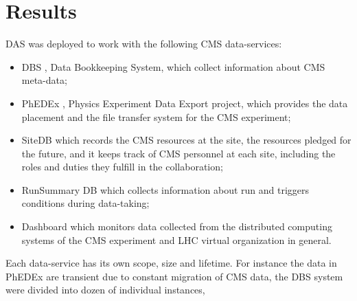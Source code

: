 \documentclass[a4paper]{jpconf}
\begin{document}

\section{Results\label{Results}}
DAS was deployed to work with the following CMS data-services:
\begin{itemize}
\item DBS \cite{DBS}, Data Bookkeeping System, which collect information
about CMS meta-data;
\item PhEDEx \cite{PhEDEx}, Physics Experiment Data Export project, which
provides the data placement and the file transfer system for the CMS experiment;
\item SiteDB \cite{SiteDB} which 
records the CMS resources at the site, the resources pledged for the 
future, and it keeps track of CMS personnel at each site, including the 
roles and duties they fulfill in the collaboration;
\item RunSummary DB \cite{RunSummary} which collects information about run and triggers
conditions during data-taking;
\item Dashboard \cite{Dashboard} which monitors data collected from the 
distributed computing systems of the CMS experiment and LHC virtual organization
in general.
\end{itemize}
Each data-service has its own scope, size and lifetime. For instance the data
in PhEDEx are transient due to constant migration of CMS data, 
the DBS system were divided into dozen of individual instances, 
\end{document}
